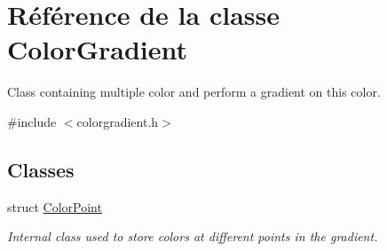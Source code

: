 \hypertarget{class_color_gradient}{}\section{Référence de la classe Color\+Gradient}
\label{class_color_gradient}


Class containing multiple color and perform a gradient on this color.  




{\ttfamily \#include $<$colorgradient.\+h$>$}

\subsection*{Classes}
\begin{DoxyCompactItemize}
\item 
struct \hyperlink{struct_color_gradient_1_1_color_point}{Color\+Point}
\begin{DoxyCompactList}\small\item\em Internal class used to store colors at different points in the gradient. \end{DoxyCompactList}\end{DoxyCompactItemize}
